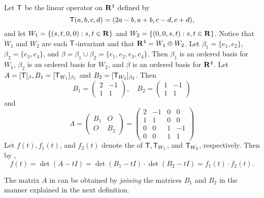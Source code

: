 \begin{example} \label{example 5.4.8}
Let \(\textsf{T}\) be the linear operator on \(\mathbf{R}^4\) defined by
\[
    \textsf{T}(a, b, c, d) = (2a - b, a + b, c - d, c + d),
\]
and let \(W_1 = \{(s, t, 0, 0): s,t \in \mathbf{R}\}\) and \(W_2 = \{(0, 0, s, t): s,t \in \mathbf{R}\}\).
Notice that \(W_1\) and \(W_2\) are each \(\textsf{T}\)-invariant and that \(\mathbf{R}^4 = W_1 \oplus W_2\).
Let \(\beta_1 = \{ e_1, e_2 \}\), \(\beta_2 = \{ e_3, e_4 \}\), and \(\beta = \beta_1 \cup \beta_2 = \{ e_1, e_2, e_3, e_4 \}\).
Then \(\beta_1\) is an ordered basis for \(W_1\), \(\beta_2\) is an ordered basis for \(W_2\), and \(\beta\) is an ordered basis for \(\mathbf{R}^4\).
Let \(A= [\textsf{T}]_{\beta}, B_1 = [\textsf{T}_{W_1}]_{\beta_1}\) and \(B_2 = [\textsf{T}_{W_2}]_{\beta_2}\).
Then
\[
    B_1 = \begin{pmatrix} 2 & -1 \\ 1 & 1 \end{pmatrix}, \quad
    B_2 =\begin{pmatrix} 1 & -1 \\ 1 & 1 \end{pmatrix}
\]
and
\[
    A = \begin{pmatrix} B_1 & O \\ O & B_2 \end{pmatrix}
    = \begin{pmatrix}
        2 & -1 & 0 & 0 \\
        1 & 1 & 0 & 0 \\
        0 & 0 & 1 & -1 \\
        0 & 0 & 1 & 1
    \end{pmatrix}
\]
Let \(f(t), f_1(t)\), and \(f_{2}(t)\) denote the \CPOLY{} of \(\textsf{T}, \textsf{T}_{W_1}\), and \(\textsf{T}_{W_2}\), respectively.
Then by ,
\[
    f(t) = \det(A - tI) = \det(B_1 - tI) \cdot \det(B_2 - tI) = f_1(t) \cdot f_2(t).
\]
\end{example}

The matrix \(A\) in  can be obtained by \emph{joining} the matrices \(B_1\) and \(B_2\) in the manner explained in the next definition.

